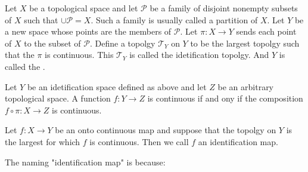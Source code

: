 \documentclass{article}
\begin{document}
\begin{defi}
Let $X$ be a topological space and let $\mathscr{P}$ be a family of
disjoint nonempty subsets of $X$ such that $\cup \mathscr{P}=X$. Such
a family is usually called a partition of $X$. Let $Y$ be a new space
whose points are the members of $\mathscr{P}$. Let $\pi:X\to Y$ sends
each point of $X$ to the subset of $\mathscr{P}$. Define a topolgy
$\mathcal{T}_Y$ on $Y$ to be the largest topolgy such that the $\pi$
is continuous. This $\mathcal{T}_Y$ is called the idetification topolgy.
And $Y$ is called the .
\end{defi}
\begin{center}  \end{center}
\begin{thm}
    Let $Y$ be an idetification space defined as above and let $Z$ be
    an arbitrary topological space. A function $f:Y\to Z$ is
    continuous if and ony if the composition $f\circ \pi:X\to Z$ is
    continuous.
\end{thm}
\begin{center}  \end{center}
\begin{defi}
    Let $f:X\to Y$ be an onto continuous map and suppose that the topolgy on $Y$
    is the largest for which $f$ is continuous. Then we call $f$ an
    identification map.
\end{defi}
The naming "identification map" is because:
\end{document}
